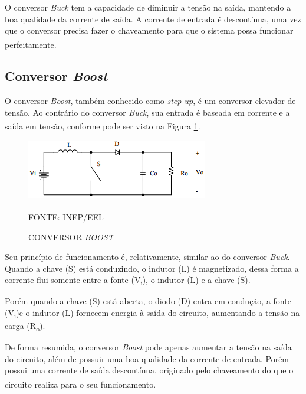 \documentclass[
	12pt,				%
	openright,			%
	oneside,			%
	a4paper,			%
	english,			%
	french,				%
	spanish,			%
	brazil,				%
	oldfontcommands
	]{abntex2}
\begin{document}
	O conversor \textit{Buck} tem a capacidade de diminuir a tensão na saída, mantendo a boa qualidade da corrente de saída. A corrente de entrada é descontínua, uma vez que o conversor precisa fazer o chaveamento para que o sistema possa funcionar perfeitamente.\textsuperscript{\cite{inep}}
	
\subsection[Conversor Boost]{Conversor \textit{Boost}}

	O conversor \textit{Boost}, também conhecido como \textit{step-up}, é um conversor elevador de tensão. Ao contrário do conversor \textit{Buck}, sua entrada é baseada em corrente e a saída em tensão, conforme pode ser visto na Figura \ref{Fig_boost}.\textsuperscript{\cite{inep}}

 	\begin{figure}[th]
		\caption{CONVERSOR \textit{BOOST}}
		\label{Fig_boost}
		\centering
		\includegraphics[width=0.75\linewidth]{./figs/boost}
			
		\begin{small}
			FONTE: INEP/EEL\textsuperscript{\cite{inep}}
		\end{small}		
	\end{figure}
	
	Seu princípio de funcionamento é, relativamente, similar ao do conversor \textit{Buck}. Quando a chave (S) está conduzindo, o indutor (L) é magnetizado, dessa forma a corrente flui somente entre a fonte (V\textsubscript{i}), o indutor (L) e a chave (S).
	
	Porém quando a chave (S) está aberta, o diodo (D) entra em condução, a fonte (V\textsubscript{i})e o indutor (L) fornecem energia à saída do circuito, aumentando a tensão na carga (R\textsubscript{o}).
	
	De forma resumida, o conversor \textit{Boost} pode apenas aumentar a tensão na saída do circuito, além de possuir uma boa qualidade da corrente de entrada. Porém possui uma corrente de saída descontínua, originado pelo chaveamento do que o circuito realiza para o seu funcionamento.\textsuperscript{\cite{inep}}
	
\end{document}
